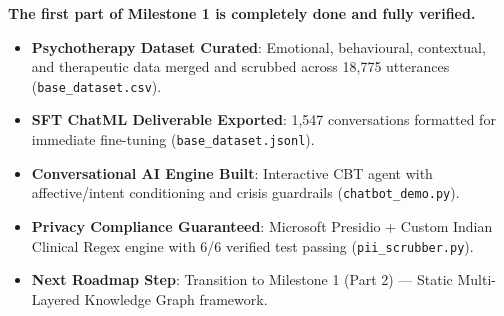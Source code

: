 \documentclass[11pt,a4paper]{article}
\begin{document}
\begin{tcolorbox}[execBox={Milestone 1 (Part 1) Delivery Certification}]
\textbf{The first part of Milestone 1 is completely done and fully verified.}
\begin{itemize}[leftmargin=*, label=\color{white}$\checkmark$]
  \item \textbf{Psychotherapy Dataset Curated}: Emotional, behavioural, contextual, and therapeutic data merged and scrubbed across 18,775 utterances (\texttt{base\_dataset.csv}).
  \item \textbf{SFT ChatML Deliverable Exported}: 1,547 conversations formatted for immediate fine-tuning (\texttt{base\_dataset.jsonl}).
  \item \textbf{Conversational AI Engine Built}: Interactive CBT agent with affective/intent conditioning and crisis guardrails (\texttt{chatbot\_demo.py}).
  \item \textbf{Privacy Compliance Guaranteed}: Microsoft Presidio + Custom Indian Clinical Regex engine with 6/6 verified test passing (\texttt{pii\_scrubber.py}).
  \item \textbf{Next Roadmap Step}: Transition to Milestone 1 (Part 2) --- Static Multi-Layered Knowledge Graph framework.
\end{itemize}
\end{tcolorbox}
\end{document}
